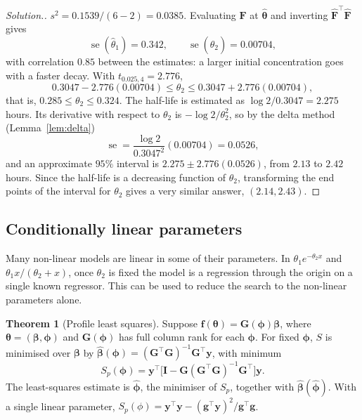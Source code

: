 \documentclass[11pt,a4paper]{article}
\numberwithin{equation}{section}
\theoremstyle{definition}
\newtheorem{thm}{Theorem}[subsection]
\newenvironment{solution}
  {\renewcommand{\qedsymbol}{}\begin{proof}[\textit{Solution}.]}
  {\end{proof}}
\begin{document}
\begin{solution}
$s^2 = 0.1539/(6 - 2) = 0.0385$. Evaluating $\mathbf{F}$ at $\hat{\boldsymbol\theta}$ and inverting $\hat{\mathbf{F}}^\top\hat{\mathbf{F}}$ gives
\[
\operatorname{se}(\hat\theta_1) = 0.342 , \qquad \operatorname{se}(\hat\theta_2) = 0.00704 ,
\]
with correlation $0.85$ between the estimates: a larger initial concentration goes with a faster decay. With
$t_{0.025,4} = 2.776$,
\[
0.3047 - 2.776(0.00704) \le \theta_2 \le 0.3047 + 2.776(0.00704) ,
\]
that is, $0.285 \le \theta_2 \le 0.324$.
The half-life is estimated as $\log 2/0.3047 = 2.275$ hours. Its derivative with respect to $\theta_2$ is $-\log 2/\theta_2^2$, so by the delta
method (Lemma~\ref{lem:delta})
\[
\operatorname{se} = \frac{\log 2}{0.3047^2}(0.00704) = 0.0526 ,
\]
and an approximate $95\%$ interval is $2.275 \pm 2.776(0.0526)$, from $2.13$ to $2.42$ hours. Since the half-life is a decreasing
function of $\theta_2$, transforming the end points of the interval for $\theta_2$ gives a very similar answer, $(2.14, 2.43)$.
\end{solution}

\subsection{Conditionally linear parameters}
Many non-linear models are linear in some of their parameters. In $\theta_1e^{-\theta_2x}$ and $\theta_1x/(\theta_2 + x)$, once $\theta_2$ is fixed the
model is a regression through the origin on a single known regressor. This can be used to reduce the
search to the non-linear parameters alone.

\begin{thm}[Profile least squares]\label{thm:profile}
Suppose $\mathbf{f}(\boldsymbol\theta) = \mathbf{G}(\boldsymbol\phi)\boldsymbol\beta$, where $\boldsymbol\theta = (\boldsymbol\beta, \boldsymbol\phi)$ and $\mathbf{G}(\boldsymbol\phi)$ has full column rank for each $\boldsymbol\phi$. For fixed $\boldsymbol\phi$, $S$ is
minimised over $\boldsymbol\beta$ by $\hat{\boldsymbol\beta}(\boldsymbol\phi) = (\mathbf{G}^\top\mathbf{G})^{-1}\mathbf{G}^\top\mathbf{y}$, with minimum
\[
S_p(\boldsymbol\phi) = \mathbf{y}^\top\bigl[\mathbf{I} - \mathbf{G}(\mathbf{G}^\top\mathbf{G})^{-1}\mathbf{G}^\top\bigr]\mathbf{y} .
\]
The least-squares estimate is $\hat{\boldsymbol\phi}$, the minimiser of $S_p$, together with $\hat{\boldsymbol\beta}(\hat{\boldsymbol\phi})$. With a single linear parameter,
$S_p(\phi) = \mathbf{y}^\top\mathbf{y} - (\mathbf{g}^\top\mathbf{y})^2/\mathbf{g}^\top\mathbf{g}$.
\end{thm}
\end{document}
